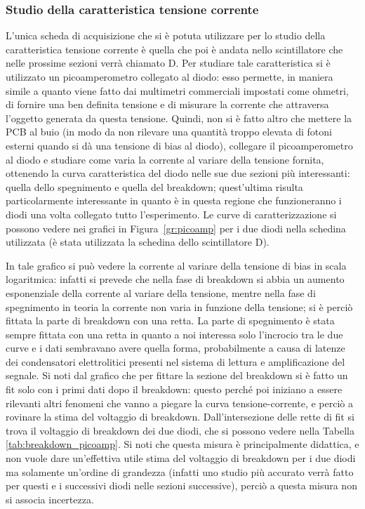 \subsubsection{Studio della caratteristica tensione corrente}
L'unica scheda di acquisizione che si è potuta utilizzare per lo studio della caratteristica tensione corrente è quella che poi è andata nello scintillatore che nelle prossime sezioni verrà chiamato D. Per studiare tale caratteristica si è utilizzato un picoamperometro collegato al diodo: esso permette, in maniera simile a quanto viene fatto dai multimetri commerciali
impostati come ohmetri, di fornire una ben definita tensione e di misurare la corrente che attraversa l'oggetto generata da questa tensione. Quindi,
non si è fatto altro che mettere la PCB al buio (in modo da non rilevare una quantità troppo elevata di fotoni esterni quando si dà una tensione di bias al diodo),
collegare il picoamperometro al diodo e studiare come varia la corrente al variare della tensione fornita, ottenendo la curva caratteristica del diodo nelle sue due
sezioni più interessanti: quella dello spegnimento e quella del breakdown; quest'ultima risulta particolarmente interessante in quanto è in questa regione che funzioneranno
i diodi una volta collegato tutto l'esperimento. Le curve di caratterizzazione si possono vedere nei grafici in Figura~\ref{gr:picoamp} per i due  diodi nella schedina utilizzata (è stata utilizzata la schedina dello scintillatore D).

In tale grafico si può vedere la corrente al variare della tensione di bias in scala logaritmica: infatti si prevede che nella fase  di breakdown si abbia un aumento esponenziale della corrente al variare della tensione, mentre nella fase di spegnimento in teoria la corrente non varia in funzione della tensione; si \`e perci\`o fittata la parte di breakdown con una retta. La parte di spegnimento \`e stata sempre fittata con una retta in quanto a noi interessa solo l'incrocio tra le due curve e i dati sembravano avere quella forma, probabilmente a causa di latenze dei condensatori elettrolitici presenti nel sistema di lettura e amplificazione del segnale.
 Si noti dal grafico che per fittare la sezione del breakdown si è fatto un fit solo con i primi dati dopo il breakdown: questo perché poi iniziano a essere rilevanti altri fenomeni che vanno a piegare la curva tensione-corrente, e perciò a rovinare la stima del voltaggio di breakdown.
Dall'intersezione delle rette di fit si trova il voltaggio di breakdown dei due diodi, che si possono vedere nella Tabella \ref{tab:breakdown_picoamp}.
Si noti che questa misura è principalmente didattica, e non vuole dare un'effettiva utile stima del voltaggio di breakdown per i due diodi ma solamente un'ordine di grandezza
(infatti uno studio più accurato verrà fatto per questi e i successivi diodi nelle sezioni successive), perciò a questa misura non si associa incertezza.

